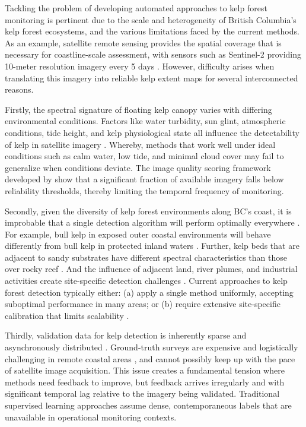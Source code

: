 \documentclass[12pt,oneside]{book}
\begin{document}
Tackling the problem of developing automated approaches to kelp forest monitoring is pertinent due to the scale and  heterogeneity of British Columbia's kelp forest ecosystems, and the various limitations faced by the current methods. As an example, satellite remote sensing provides the spatial coverage that is necessary for coastline-scale assessment, with sensors such as Sentinel-2 providing 10-meter resolution imagery every 5 days \citep{Gendall2023}. However, difficulty arises when translating this imagery into reliable kelp extent maps for several interconnected reasons.

Firstly, the spectral signature of floating kelp canopy varies with differing environmental conditions. Factors like water turbidity, sun glint, atmospheric conditions, tide height, and kelp physiological state all influence the detectability of kelp in satellite imagery \citep{Schroeder2020}. Whereby, methods that work well under ideal conditions such as calm water, low tide, and minimal cloud cover may fail to generalize when conditions deviate. The image quality scoring framework developed by \citet{Schroeder2020} show that a significant fraction of available imagery falls below reliability thresholds, thereby limiting the temporal frequency of monitoring.

Secondly, given the diversity of kelp forest environments along BC's coast, it is improbable that a single detection algorithm will perform optimally everywhere \citep{Starko2024, MoraSoto2024}. For example, bull kelp in exposed outer coastal environments will behave differently from bull kelp in protected inland waters \citep{Schroeder2019}. Further, kelp beds that are adjacent to sandy substrates have different spectral characteristics than those over rocky reef \citep{Timmer2022}. And the influence of adjacent land, river plumes, and industrial activities create site-specific detection challenges \citep{Schroeder2020}. Current approaches to kelp forest detection typically either: (a) apply a single method uniformly, accepting suboptimal performance in many areas; or (b) require extensive site-specific calibration that limits scalability \citep{Timmer2024}.

Thirdly, validation data for kelp detection is inherently sparse and asynchronously distributed \citep{CavanaughUAV2021}. Ground-truth surveys are expensive and logistically challenging in remote coastal areas \citep{Gendall2022drivers, Schroeder2019}, and cannot possibly keep up with the pace of satellite image acquisition. This issue creates a fundamental tension where methods need feedback to improve, but feedback arrives irregularly and with significant temporal lag relative to the imagery being validated. Traditional supervised learning approaches assume dense, contemporaneous labels that are unavailable in operational monitoring contexts.
\end{document}

